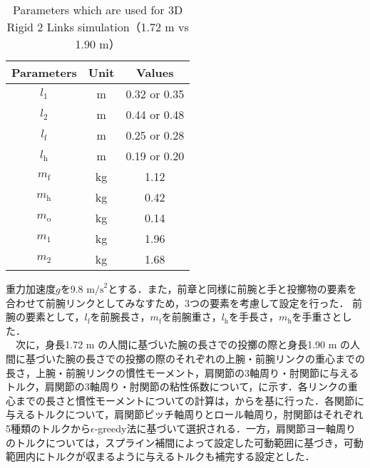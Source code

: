 \begin{table}[tb]
  \begin{center}
    \caption{Parameters which are used for 3D Rigid 2 Links simulation（1.72 m vs 1.90 m）}
    \begin{tabular}{c|c|c}
      \hline
      Parameters & Unit & Values \\
      \hline
      $l_{1}$ & m & 0.32 or 0.35 \\
      $l_{2}$ & m & 0.44 or 0.48 \\
      $l_{\mathrm{f}}$ & m & 0.25 or 0.28 \\
      $l_{\mathrm{h}}$ & m & 0.19 or 0.20 \\
      $m_{\mathrm{f}}$ & kg & 1.12 \\
      $m_{\mathrm{h}}$ & kg & 0.42 \\
      $m_{\mathrm{o}}$ & kg & 0.14 \\
      $m_{1}$ & kg & 1.96 \\
      $m_{2}$ & kg & 1.68 \\
      \hline
    \end{tabular}
  \end{center}
\end{table}

重力加速度$g$を9.8 $\mathrm{m/s}^{2}$とする．また，前章と同様に前腕と手と投擲物の要素を合わせて前腕リンクとしてみなすため，3つの要素を考慮して設定を行った．
前腕の要素として，$l_{\mathrm{f}}$を前腕長さ，$m_{\mathrm{f}}$を前腕重さ，$l_{\mathrm{h}}$を手長さ，$m_{\mathrm{h}}$を手重さとした．\\
　次に，身長1.72 m の人間に基づいた腕の長さでの投擲の際と身長1.90 m の人間に基づいた腕の長さでの投擲の際のそれぞれの上腕・前腕リンクの重心までの長さ，上腕・前腕リンクの慣性モーメント，肩関節の3軸周り・肘関節に与えるトルク，肩関節の3軸周り・肘関節の粘性係数について，に示す．各リンクの重心までの長さと慣性モーメントについての計算は，からを基に行った．各関節に与えるトルクについて，肩関節ピッチ軸周りとロール軸周り，肘関節はそれぞれ5種類のトルクから$\epsilon$-greedy法に基づいて選択される．一方，肩関節ヨー軸周りのトルクについては，スプライン補間によって設定した可動範囲に基づき，可動範囲内にトルクが収まるように与えるトルクも補完する設定とした．

